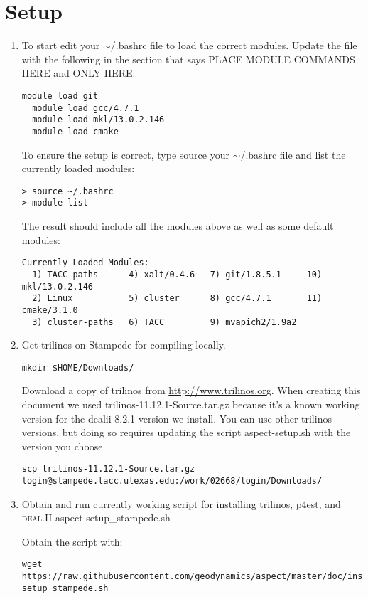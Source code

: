 \documentclass{article}
\newcommand{\dealii}{{\textsc{deal.II}}}
\begin{document}
\section{Setup}
\begin{enumerate}
\item To start edit your $\sim$/.bashrc file to load the correct modules. Update the file with the following in the 
section that says PLACE MODULE COMMANDS HERE and ONLY HERE: 

\begin{lstlisting}[frame=single,language=ksh]
  module load git 
  module load gcc/4.7.1 
  module load mkl/13.0.2.146 
  module load cmake 
\end{lstlisting}

To ensure the setup is correct, type source your $\sim$/.bashrc file and list the currently loaded modules:
\begin{lstlisting}[frame=single,language=ksh]
> source ~/.bashrc 
> module list
\end{lstlisting}
The result should include all the modules above as well as some default modules:
\begin{lstlisting}[frame=single,language=ksh]
Currently Loaded Modules:
  1) TACC-paths      4) xalt/0.4.6   7) git/1.8.5.1     10) mkl/13.0.2.146
  2) Linux           5) cluster      8) gcc/4.7.1       11) cmake/3.1.0
  3) cluster-paths   6) TACC         9) mvapich2/1.9a2
\end{lstlisting}

\item Get trilinos on Stampede for compiling locally. 

\begin{lstlisting}[frame=single,language=ksh]
mkdir $HOME/Downloads/ 
\end{lstlisting} 
Download a copy of trilinos from \url{http://www.trilinos.org}. When creating this document we used 
 trilinos-11.12.1-Source.tar.gz because it's a known working version for the dealii-8.2.1 
 version we install. You can use other trilinos versions, but doing so requires updating 
 the script aspect-setup.sh with the version you choose.
\begin{lstlisting}[frame=single,language=ksh]
 scp trilinos-11.12.1-Source.tar.gz  login@stampede.tacc.utexas.edu:/work/02668/login/Downloads/ 
\end{lstlisting} 
 
 \item Obtain and run currently working script for installing trilinos, p4est, and \dealii{}  aspect-setup\_stampede.sh 
 
 
Obtain the script with: 
\begin{lstlisting}[frame=single,language=ksh]
wget https://raw.githubusercontent.com/geodynamics/aspect/master/doc/install/aspect-setup_stampede.sh
\end{lstlisting}  
 
 \end{enumerate}
\end{document}
